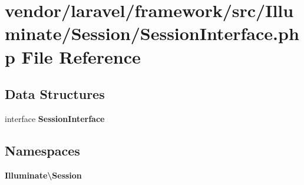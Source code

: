 \section{vendor/laravel/framework/src/\+Illuminate/\+Session/\+Session\+Interface.php File Reference}
\label{laravel_2framework_2src_2_illuminate_2_session_2_session_interface_8php}
\subsection*{Data Structures}
\begin{DoxyCompactItemize}
\item 
interface {\bf Session\+Interface}
\end{DoxyCompactItemize}
\subsection*{Namespaces}
\begin{DoxyCompactItemize}
\item 
 {\bf Illuminate\textbackslash{}\+Session}
\end{DoxyCompactItemize}
